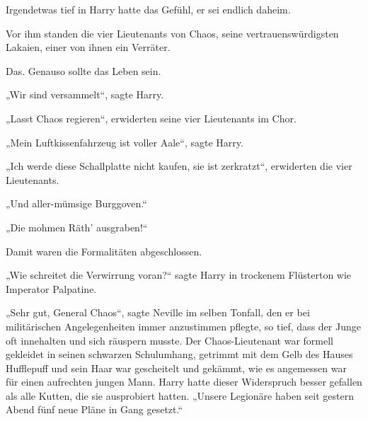 Irgendetwas tief in Harry hatte das Gefühl, er sei endlich daheim.

Vor ihm standen die vier Lieutenants von Chaos, seine vertrauenswürdigsten Lakaien, einer von ihnen ein Verräter.

Das. Genauso sollte das Leben sein.

„Wir sind versammelt“, sagte Harry.

„Lasst Chaos regieren“, erwiderten seine vier Lieutenants im Chor.

„Mein Luftkissenfahrzeug ist voller Aale“, sagte Harry.

„Ich werde diese Schallplatte nicht kaufen, sie ist zerkratzt“, erwiderten die vier Lieutenants.

„Und aller-mümsige Burggoven.“

„Die mohmen Räth’ ausgraben!“

Damit waren die Formalitäten abgeschlossen.

„Wie schreitet die Verwirrung voran?“ sagte Harry in trockenem Flüsterton wie Imperator Palpatine.

„Sehr gut, General Chaos“, sagte Neville im selben Tonfall, den er bei militärischen Angelegenheiten immer anzustimmen pflegte, so tief, dass der Junge oft innehalten und sich räuspern musste. Der Chaos-Lieutenant war formell gekleidet in seinen schwarzen Schulumhang, getrimmt mit dem Gelb des Hauses Hufflepuff und sein Haar war gescheitelt und gekämmt, wie es angemessen war für einen aufrechten jungen Mann. Harry hatte dieser Widerspruch besser gefallen als alle Kutten, die sie ausprobiert hatten.
„Unsere Legionäre haben seit gestern Abend fünf neue Pläne in Gang gesetzt.“

